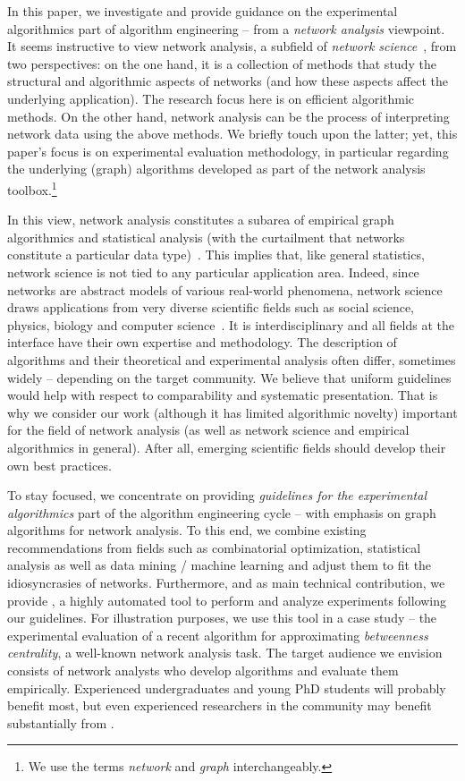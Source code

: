 \documentclass[algorithms,article,submit,moreauthors,pdftex]{Definitions/mdpi}
\newcounter{guideline}
\newcommand{\changed}[1]{#1}
\begin{document}
In this paper, we investigate and provide guidance on the experimental algorithmics part of algorithm
engineering -- from a \emph{network analysis} viewpoint.
%
It seems instructive to view network analysis, a subfield of \emph{network science}~\cite{brandes_robins_mccranie_wasserman_2013}, from two perspectives:
on the one hand, it is a collection of methods that study the structural and algorithmic aspects of networks
(and how these aspects affect the underlying application). The research focus here is on efficient
algorithmic methods.
%
On the other hand, network analysis can be the process of interpreting network data using the above methods.
We briefly touch upon the latter; yet, this paper's focus is on experimental evaluation methodology,
in particular regarding the underlying (graph) algorithms developed as part of the network analysis toolbox.\footnote{We use the terms \emph{network} and \emph{graph} interchangeably.}

In this view, network analysis constitutes a subarea of empirical graph algorithmics and statistical analysis
(with the curtailment that networks constitute a particular data type)~\cite{brandes_robins_mccranie_wasserman_2013}.
This implies that, like general statistics, network science is not tied to any particular application area.
Indeed, since networks are abstract models of various real-world phenomena, network science draws applications from very diverse
scientific fields such as social science, physics, biology and computer science~\cite{newman2018networks}.
It is interdisciplinary and all fields at the interface have their own expertise and methodology.
The description of algorithms and their theoretical and experimental analysis often differ, sometimes widely -- depending on the target community.
%
We believe that uniform guidelines would help with respect to comparability and systematic presentation.
That is why we consider our work (although it has limited algorithmic novelty) important for the field
of network analysis (as well as network science and empirical algorithmics in general).
After all, emerging scientific fields should develop their own best practices.

To stay focused, we concentrate on providing \emph{guidelines for the experimental algorithmics} part
of the algorithm engineering cycle -- with emphasis on graph algorithms for network analysis.
To this end, we combine existing recommendations
from fields such as \changed{combinatorial optimization,} statistical analysis as well as data mining / machine learning and
adjust them to fit the idiosyncrasies of networks.
%
Furthermore, and as main technical contribution, we provide \exptool,
a highly automated tool to perform and analyze experiments following our guidelines.
For illustration purposes, we use this tool in a case study --
the experimental evaluation of a recent algorithm for approximating \emph{betweenness centrality},
a well-known network analysis task.
%
The target audience we envision consists of network analysts who develop algorithms and evaluate them
empirically. Experienced undergraduates and young PhD students will probably benefit most,
but even experienced researchers in the community may benefit substantially from \exptool.
\end{document}
